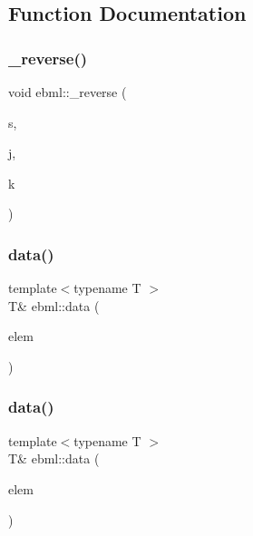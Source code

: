 \subsection{Function Documentation}
\mbox{\label{namespaceebml_ac1a0abdc17f3f647cf7d1fa990622b89}} 
\subsubsection{\texorpdfstring{\+\_\+reverse()}{\_reverse()}}
{\footnotesize\ttfamily void ebml\+::\+\_\+reverse (\begin{DoxyParamCaption}\item[{char $\ast$}]{s,  }\item[{unsigned int}]{j,  }\item[{unsigned int}]{k }\end{DoxyParamCaption})}

\mbox{\label{namespaceebml_a6365629b3110a3c5d0cde94d08aac26c}} 
\subsubsection{\texorpdfstring{data()}{data()}\hspace{0.1cm}{\footnotesize\ttfamily [1/5]}}
{\footnotesize\ttfamily template$<$typename T $>$ \\
T\& ebml\+::data (\begin{DoxyParamCaption}\item[{const \mbox{\hyperlink{classebml_1_1childSlot__t}{child\+Slot\+\_\+t}} \&}]{elem }\end{DoxyParamCaption})}

\mbox{\label{namespaceebml_ab21f8b4ff85186f670f17e84a02d9740}} 
\subsubsection{\texorpdfstring{data()}{data()}\hspace{0.1cm}{\footnotesize\ttfamily [2/5]}}
{\footnotesize\ttfamily template$<$typename T $>$ \\
T\& ebml\+::data (\begin{DoxyParamCaption}\item[{const \mbox{\hyperlink{namespaceebml_adad533b7705a16bb360fe56380c5e7be}{ebml\+Element\+\_\+sp}} \&}]{elem }\end{DoxyParamCaption})}

